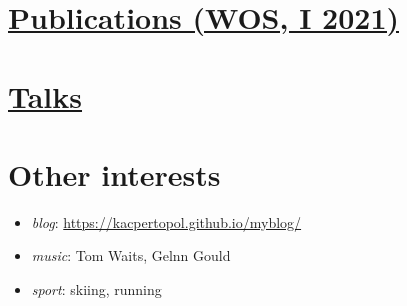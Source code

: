 \documentclass{article}
\providecommand{\tightlist}{%
  \setlength{\itemsep}{0pt}\setlength{\parskip}{0pt}}
\begin{document}
\hypertarget{publications-wos-i-2021}{%
\section{\texorpdfstring{\href{./0pl.html}{Publications (WOS, I
2021)}}{Publications (WOS, I 2021)}}\label{publications-wos-i-2021}}

\hypertarget{talks}{%
\section{\texorpdfstring{\href{./00pl.html}{Talks}}{Talks}}\label{talks}}

\hypertarget{other-interests}{%
\section{Other interests}\label{other-interests}}

\begin{itemize}
\tightlist
\item
  \emph{blog}: \url{https://kacpertopol.github.io/myblog/}
\item
  \emph{music}: Tom Waits, Gelnn Gould
\item
  \emph{sport}: skiing, running
\end{itemize}
\end{document}
